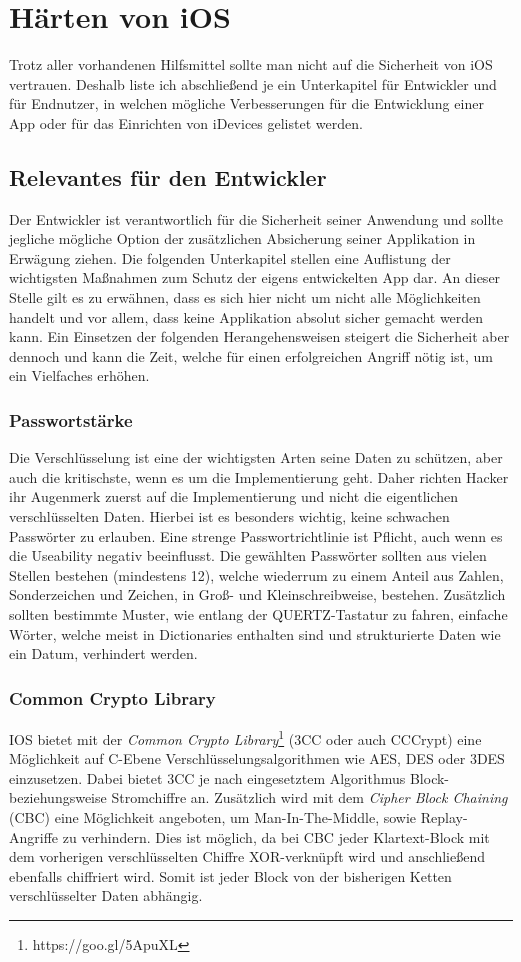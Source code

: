 \section{Härten von iOS}
	Trotz aller vorhandenen Hilfsmittel sollte man nicht auf die Sicherheit von iOS
	vertrauen. Deshalb liste ich abschließend je ein Unterkapitel für Entwickler
	und für Endnutzer, in welchen mögliche Verbesserungen für die
	Entwicklung einer App oder für das Einrichten von iDevices gelistet werden.
	\subsection{Relevantes für den Entwickler}
		Der Entwickler ist verantwortlich für die Sicherheit seiner Anwendung und
		sollte jegliche mögliche Option der zusätzlichen Absicherung seiner
		Applikation in Erwägung ziehen. Die folgenden Unterkapitel stellen eine
		Auflistung der wichtigsten Maßnahmen zum Schutz der eigens entwickelten App
		dar. An dieser Stelle gilt es zu erwähnen, dass es sich hier nicht um nicht
		alle Möglichkeiten handelt und vor allem, dass keine Applikation absolut
		sicher gemacht werden kann. Ein Einsetzen der folgenden Herangehensweisen
		steigert die Sicherheit aber dennoch und kann die Zeit, welche für einen
		erfolgreichen Angriff nötig ist, um ein Vielfaches erhöhen.
		\subsubsection{Passwortstärke}
			Die Verschlüsselung ist eine der wichtigsten Arten seine Daten zu schützen,
			aber auch die kritischste, wenn es um die Implementierung geht. Daher richten
			Hacker ihr Augenmerk zuerst auf die Implementierung und nicht die
			eigentlichen verschlüsselten Daten. Hierbei ist es besonders wichtig, keine
			schwachen Passwörter zu erlauben. Eine strenge Passwortrichtlinie ist
			Pflicht, auch wenn es die Useability negativ beeinflusst. Die gewählten
			Passwörter sollten aus vielen Stellen bestehen (mindestens 12),
			welche wiederrum zu einem Anteil aus Zahlen, Sonderzeichen und Zeichen, in
			Groß- und Kleinschreibweise, bestehen. Zusätzlich sollten bestimmte Muster,
			wie entlang der QUERTZ-Tastatur zu fahren, einfache Wörter, welche meist in
			Dictionaries enthalten sind und strukturierte Daten wie ein Datum, verhindert
			werden.
		\subsubsection{Common Crypto Library}
			IOS bietet mit der \textsl{Common Crypto Library}\footnote{https://goo.gl/5ApuXL}
			(3CC oder auch CCCrypt) eine Möglichkeit auf C-Ebene 
			Verschlüsselungsalgorithmen wie AES, DES oder 3DES einzusetzen. Dabei bietet
			3CC je nach eingesetztem Algorithmus Block- beziehungsweise Stromchiffre an.
			Zusätzlich wird mit dem \textsl{Cipher Block Chaining} (CBC) eine
			Möglichkeit angeboten, um Man-In-The-Middle, sowie Replay-Angriffe zu
			verhindern. Dies ist möglich, da bei CBC jeder Klartext-Block mit dem
			vorherigen verschlüsselten Chiffre XOR-verknüpft wird und anschließend
			ebenfalls chiffriert wird. Somit ist jeder Block von der bisherigen Ketten
			verschlüsselter Daten abhängig.
